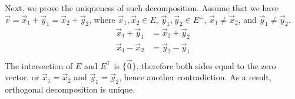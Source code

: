 \documentclass{article}
\begin{document}
\begin{enumerate}[1.]
Next, we prove the uniqueness of such decomposition. Assume that we have $\vec{v} = \vec{x}_1 + \vec{y}_1 = \vec{x}_2 + \vec{y}_2$, where $\vec{x}_1, \vec{x}_2 \in E$, $\vec{y}_1, \vec{y}_2 \in E^{\bot}$, $\vec{x}_1 \neq \vec{x}_2$, and $\vec{y}_1 \neq \vec{y}_2$.
$$
\begin{aligned}
\vec{x}_1 + \vec{y}_1 &= \vec{x}_2 + \vec{y}_2 \\
\vec{x}_1 - \vec{x}_2 &= \vec{y}_2 - \vec{y}_1 \\
\end{aligned}
$$
The intersection of $E$ and $E^{\top}$ is $\{\vec{0}\}$, therefore both sides equal to the zero vector, or $\vec{x}_1 = \vec{x}_2$ and $\vec{y}_1 = \vec{y}_2$, hence another contradiction. As a result, orthogonal decomposition is unique. \rQED
\end{enumerate}
\end{document}
